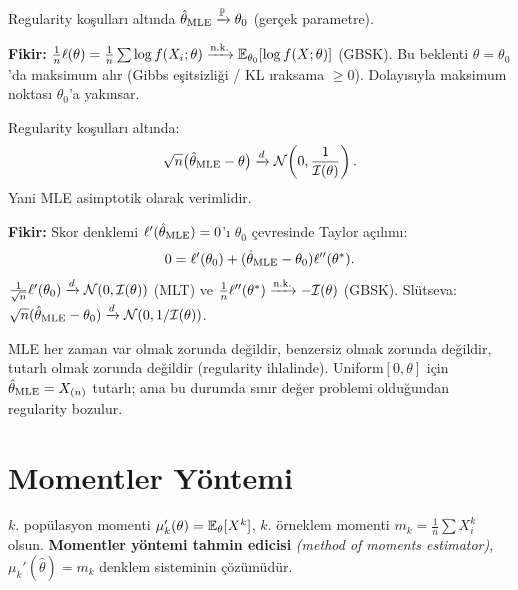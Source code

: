 \begin{teorem}[Tutarlılık]\label{thm:mle_tutarlilik}
Regularity koşulları altında $\hat{\theta}_{\text{MLE}} \xrightarrow{\mathbb{P}} \theta_0$ (gerçek parametre).
\end{teorem}

\begin{ispatiskele}
\textbf{Fikir:} $\frac{1}{n}\ell(\theta) = \frac{1}{n}\sum\log f(X_i;\theta) \xrightarrow{\text{n.k.}} \mathbb{E}_{\theta_0}[\log f(X;\theta)]$ (GBSK). Bu beklenti $\theta=\theta_0$'da maksimum alır (Gibbs eşitsizliği / KL ıraksama $\geq 0$). Dolayısıyla maksimum noktası $\theta_0$'a yakınsar.
\end{ispatiskele}

\begin{teorem}\label{thm:mle_asimptotik}
Regularity koşulları altında:
\[
  \sqrt{n}\bigl(\hat{\theta}_{\text{MLE}} - \theta\bigr) \xrightarrow{d} \mathcal{N}\!\left(0,\frac{1}{\mathcal{I}(\theta)}\right).
\]
Yani MLE asimptotik olarak verimlidir.
\end{teorem}

\begin{ispatiskele}
\textbf{Fikir:} Skor denklemi $\ell'(\hat{\theta}_{\text{MLE}})=0$'ı $\theta_0$ çevresinde Taylor açılımı:
\[
  0 = \ell'(\theta_0) + (\hat{\theta}_{\text{MLE}}-\theta_0)\ell''(\theta^*).
\]
$\frac{1}{\sqrt{n}}\ell'(\theta_0)\xrightarrow{d}\mathcal{N}(0,\mathcal{I}(\theta))$ (MLT) ve $\frac{1}{n}\ell''(\theta^*)\xrightarrow{\text{n.k.}} -\mathcal{I}(\theta)$ (GBSK). Slütseva: $\sqrt{n}(\hat{\theta}_{\text{MLE}}-\theta_0)\xrightarrow{d}\mathcal{N}(0,1/\mathcal{I}(\theta))$.
\end{ispatiskele}

\begin{hataanalizi}
MLE her zaman var olmak zorunda değildir, benzersiz olmak zorunda değildir, tutarlı olmak zorunda değildir (regularity ihlalinde). Uniform$[0,\theta]$ için $\hat{\theta}_{\text{MLE}}=X_{(n)}$ tutarlı; ama bu durumda sınır değer problemi olduğundan regularity bozulur.
\end{hataanalizi}

\section{Momentler Yöntemi}
\label{sec:momentler_yontemi}

\begin{tanim}\label{def:momentler_yontemi}
$k$. popülasyon momenti $\mu_k'(\theta) = \mathbb{E}_\theta[X^k]$, $k$. örneklem momenti $m_k = \frac{1}{n}\sum X_i^k$ olsun. \textbf{Momentler yöntemi tahmin edicisi} \emph{(method of moments estimator)}, $\mu_k'(\hat{\theta}) = m_k$ denklem sisteminin çözümüdür.
\end{tanim}

